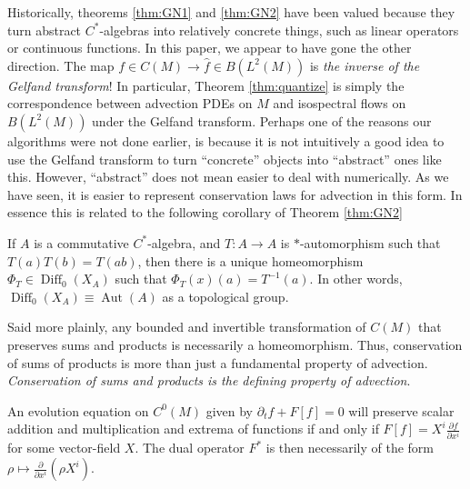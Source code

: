 \documentclass[final,leqno]{siamltex1213}
\newcommand{\pder}[2]{\ensuremath{\frac{ \partial #1}{\partial #2}}}
\DeclareMathOperator{\Diff}{Diff}
\begin{document}
Historically, theorems \ref{thm:GN1} and \ref{thm:GN2} have been valued because they turn abstract $C^{*}$-algebras into relatively concrete things, such as linear operators or continuous functions.
In this paper, we appear to have gone the other direction.
The map $f \in C(M) \to \hat{f} \in B( L^{2}(M) )$ is \emph{the inverse of the Gelfand transform}!
In particular, Theorem \ref{thm:quantize} is simply the correspondence between advection PDEs on $M$ and isospectral flows on $B(L^{2}(M))$ under the Gelfand transform.
Perhaps one of the reasons our algorithms were not done earlier, is because it is not intuitively a good idea to use the Gelfand transform to turn ``concrete'' objects into ``abstract'' ones like this.
However, ``abstract'' does not mean easier to deal with numerically.
As we have seen, it is easier to represent conservation laws for advection in this form.
In essence this is related to the following corollary of Theorem \ref{thm:GN2}

\begin{corollary}
	If $A$ is a commutative $C^{*}$-algebra, and $T:A\to A$ is $*$-automorphism such that $T(a)T(b) = T(ab)$,
	then there is a unique homeomorphism $\Phi_{T} \in \Diff_{0}(X_{A})$
	such that $\Phi_{T}(x) (a) = T^{-1}(a)$.
	In other words, $\Diff_{0}(X_{A}) \equiv \operatorname{Aut}(A)$ as a topological group.
\end{corollary}

Said more plainly, any bounded and invertible transformation of $C(M)$ that preserves sums and products is necessarily a homeomorphism.
Thus, conservation of sums of products is more than just a fundamental property of advection.
\emph{Conservation of sums and products is the defining property of advection}.

\begin{corollary}
	An evolution equation on $C^{0}(M)$ given by $\partial_{t} f + F[f] = 0$ will preserve scalar addition and multiplication and extrema of functions if and only if $F[f] = X^{i} \pder{f}{x^{i}}$ for some vector-field $X$.
	The dual operator $F^{*}$ is then necessarily of the form $\rho \mapsto \pder{}{x^{i}}( \rho X^{i})$.
\end{corollary}
\end{document}
